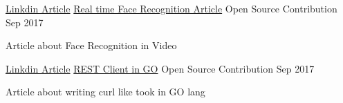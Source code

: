 

\begin{cventries}


  \cventry
    {\href{https://www.linkedin.com/pulse/real-time-face-recognition-using-facenet-ishwar-sawale/}{Linkdin Article}} %
    {\href{https://www.linkedin.com/pulse/real-time-face-recognition-using-facenet-ishwar-sawale/}{Real time Face Recognition Article}} %
    {Open Source Contribution} %
    {Sep 2017} %
    {
      \begin{cvitems} %
        \item {Article about Face Recognition in Video}
      \end{cvitems}
    }

  \cventry
    {\href{https://goo.gl/xMAZcK}{Linkdin Article}} %
    {\href{https://goo.gl/xMAZcK}{REST Client in GO}} %
    {Open Source Contribution} %
    {Sep 2017} %
    {
      \begin{cvitems} %
        \item {Article about writing curl like took in GO lang}
      \end{cvitems}
    }
    

\end{cventries}
